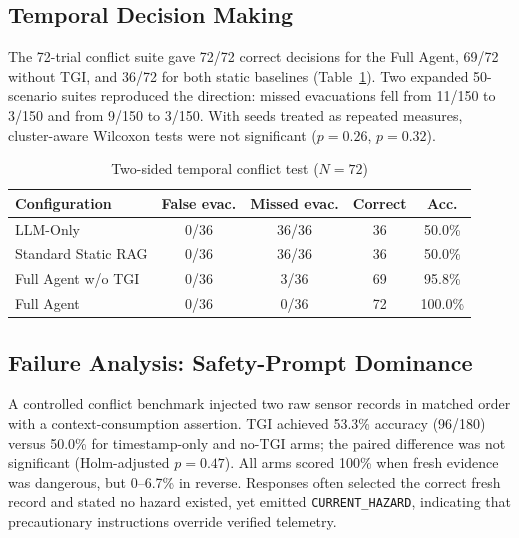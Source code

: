 \documentclass[conference]{IEEEtran}
\begin{document}
\subsection{Temporal Decision Making}
The 72-trial conflict suite gave 72/72 correct decisions for the Full Agent, 69/72 without TGI, and 36/72 for both static baselines (Table~\ref{tab:tgi}). Two expanded 50-scenario suites reproduced the direction: missed evacuations fell from 11/150 to 3/150 and from 9/150 to 3/150. With seeds treated as repeated measures, cluster-aware Wilcoxon tests were not significant ($p=0.26$, $p=0.32$).
\begin{table}[t]
\caption{Two-sided temporal conflict test ($N=72$)}
\label{tab:tgi}
\centering\scriptsize\setlength{\tabcolsep}{2pt}
\begin{tabular*}{\columnwidth}{@{\extracolsep{\fill}}lcccc@{}}
\toprule
Configuration & False evac. & Missed evac. & Correct & Acc. \\
\midrule
LLM-Only & 0/36 & 36/36 & 36 & 50.0\% \\
Standard Static RAG & 0/36 & 36/36 & 36 & 50.0\% \\
Full Agent w/o TGI & 0/36 & 3/36 & 69 & 95.8\% \\
Full Agent & 0/36 & 0/36 & 72 & 100.0\% \\
\bottomrule
\end{tabular*}
\end{table}

\subsection{Failure Analysis: Safety-Prompt Dominance}
A controlled conflict benchmark injected two raw sensor records in matched order with a context-consumption assertion. TGI achieved 53.3\% accuracy (96/180) versus 50.0\% for timestamp-only and no-TGI arms; the paired difference was not significant (Holm-adjusted $p=0.47$). All arms scored 100\% when fresh evidence was dangerous, but 0--6.7\% in reverse. Responses often selected the correct fresh record and stated no hazard existed, yet emitted \texttt{CURRENT\_HAZARD}, indicating that precautionary instructions override verified telemetry.
\end{document}
